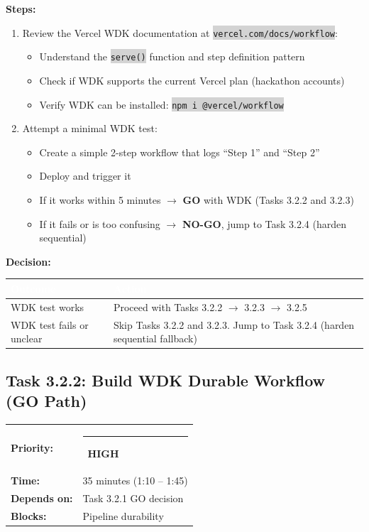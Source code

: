 \documentclass[11pt, a4paper]{article}
\newcommand{\highpri}{\textcolor{highamber}{\rule{6pt}{6pt}}~\textcolor{highamber}{\scriptsize\textbf{HIGH}}}
\newcommand{\code}[1]{\texttt{\small\colorbox{lightgray}{#1}}}
\begin{document}
\textbf{Steps:}
\begin{enumerate}[leftmargin=2em, itemsep=2pt]
  \item Review the Vercel WDK documentation at \code{vercel.com/docs/workflow}:
    \begin{itemize}[itemsep=1pt]
      \item Understand the \code{serve()} function and step definition pattern
      \item Check if WDK supports the current Vercel plan (hackathon accounts)
      \item Verify WDK can be installed: \code{npm i @vercel/workflow}
    \end{itemize}

  \item Attempt a minimal WDK test:
    \begin{itemize}[itemsep=1pt]
      \item Create a simple 2-step workflow that logs ``Step 1'' and ``Step 2''
      \item Deploy and trigger it
      \item If it works within 5 minutes $\rightarrow$ \textbf{GO} with WDK (Tasks 3.2.2 and 3.2.3)
      \item If it fails or is too confusing $\rightarrow$ \textbf{NO-GO}, jump to Task 3.2.4 (harden sequential)
    \end{itemize}
\end{enumerate}

\textbf{Decision:}
\begin{tabularx}{\textwidth}{|l|X|}
\hline
\rowcolor{primary}
\textcolor{white}{\textbf{Outcome}} & \textcolor{white}{\textbf{Action}} \\
\hline
WDK test works & Proceed with Tasks 3.2.2 $\rightarrow$ 3.2.3 $\rightarrow$ 3.2.5 \\
\hline
WDK test fails or unclear & Skip Tasks 3.2.2 and 3.2.3. Jump to Task 3.2.4 (harden sequential fallback) \\
\hline
\end{tabularx}

\vspace{1em}

\subsection{Task 3.2.2: Build WDK Durable Workflow (GO Path)}

\begin{tabularx}{\textwidth}{lX}
\textbf{Priority:} & \highpri \\
\textbf{Time:} & 35 minutes (1:10 -- 1:45) \\
\textbf{Depends on:} & Task 3.2.1 GO decision \\
\textbf{Blocks:} & Pipeline durability \\
\end{tabularx}
\end{document}
